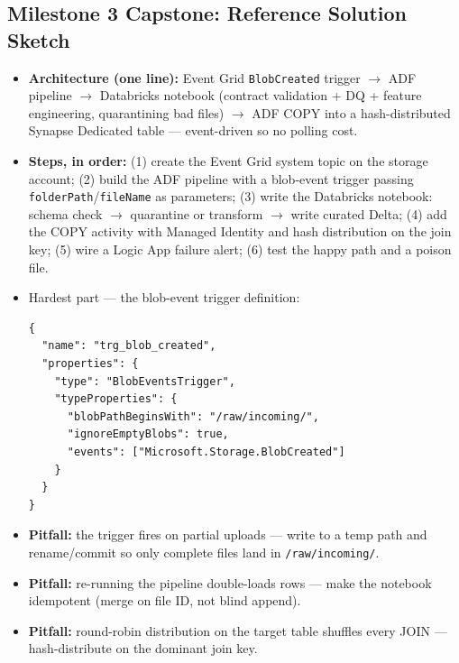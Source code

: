 \documentclass[11pt, a4paper]{article}
\begin{document}
\subsection*{Milestone 3 Capstone: Reference Solution Sketch}
\begin{itemize}[label=-, itemsep=1pt]
    \item \textbf{Architecture (one line):} Event Grid \texttt{BlobCreated} trigger $\rightarrow$ ADF pipeline $\rightarrow$ Databricks notebook (contract validation + DQ + feature engineering, quarantining bad files) $\rightarrow$ ADF COPY into a hash-distributed Synapse Dedicated table --- event-driven so no polling cost.
    \item \textbf{Steps, in order:} (1) create the Event Grid system topic on the storage account; (2) build the ADF pipeline with a blob-event trigger passing \texttt{folderPath}/\texttt{fileName} as parameters; (3) write the Databricks notebook: schema check $\rightarrow$ quarantine or transform $\rightarrow$ write curated Delta; (4) add the COPY activity with Managed Identity and hash distribution on the join key; (5) wire a Logic App failure alert; (6) test the happy path and a poison file.
    \item Hardest part --- the blob-event trigger definition:
\begin{lstlisting}[language={}]
{
  "name": "trg_blob_created",
  "properties": {
    "type": "BlobEventsTrigger",
    "typeProperties": {
      "blobPathBeginsWith": "/raw/incoming/",
      "ignoreEmptyBlobs": true,
      "events": ["Microsoft.Storage.BlobCreated"]
    }
  }
}
\end{lstlisting}
    \item \textbf{Pitfall:} the trigger fires on partial uploads --- write to a temp path and rename/commit so only complete files land in \texttt{/raw/incoming/}.
    \item \textbf{Pitfall:} re-running the pipeline double-loads rows --- make the notebook idempotent (merge on file ID, not blind append).
    \item \textbf{Pitfall:} round-robin distribution on the target table shuffles every JOIN --- hash-distribute on the dominant join key.
\end{itemize}
\end{document}
